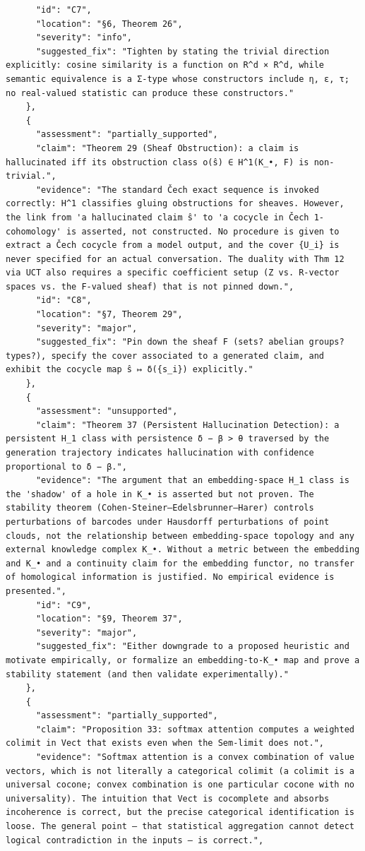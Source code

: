 \documentclass[11pt]{article}
\begin{document}
\begin{verbatim}
      "id": "C7",
      "location": "§6, Theorem 26",
      "severity": "info",
      "suggested_fix": "Tighten by stating the trivial direction explicitly: cosine similarity is a function on R^d × R^d, while semantic equivalence is a Σ-type whose constructors include η, ε, τ; no real-valued statistic can produce these constructors."
    },
    {
      "assessment": "partially_supported",
      "claim": "Theorem 29 (Sheaf Obstruction): a claim is hallucinated iff its obstruction class o(ŝ) ∈ H^1(K_•, F) is non-trivial.",
      "evidence": "The standard Čech exact sequence is invoked correctly: H^1 classifies gluing obstructions for sheaves. However, the link from 'a hallucinated claim ŝ' to 'a cocycle in Čech 1-cohomology' is asserted, not constructed. No procedure is given to extract a Čech cocycle from a model output, and the cover {U_i} is never specified for an actual conversation. The duality with Thm 12 via UCT also requires a specific coefficient setup (Z vs. R-vector spaces vs. the F-valued sheaf) that is not pinned down.",
      "id": "C8",
      "location": "§7, Theorem 29",
      "severity": "major",
      "suggested_fix": "Pin down the sheaf F (sets? abelian groups? types?), specify the cover associated to a generated claim, and exhibit the cocycle map ŝ ↦ δ({s_i}) explicitly."
    },
    {
      "assessment": "unsupported",
      "claim": "Theorem 37 (Persistent Hallucination Detection): a persistent H_1 class with persistence δ − β > θ traversed by the generation trajectory indicates hallucination with confidence proportional to δ − β.",
      "evidence": "The argument that an embedding-space H_1 class is the 'shadow' of a hole in K_• is asserted but not proven. The stability theorem (Cohen-Steiner–Edelsbrunner–Harer) controls perturbations of barcodes under Hausdorff perturbations of point clouds, not the relationship between embedding-space topology and any external knowledge complex K_•. Without a metric between the embedding and K_• and a continuity claim for the embedding functor, no transfer of homological information is justified. No empirical evidence is presented.",
      "id": "C9",
      "location": "§9, Theorem 37",
      "severity": "major",
      "suggested_fix": "Either downgrade to a proposed heuristic and motivate empirically, or formalize an embedding-to-K_• map and prove a stability statement (and then validate experimentally)."
    },
    {
      "assessment": "partially_supported",
      "claim": "Proposition 33: softmax attention computes a weighted colimit in Vect that exists even when the Sem-limit does not.",
      "evidence": "Softmax attention is a convex combination of value vectors, which is not literally a categorical colimit (a colimit is a universal cocone; convex combination is one particular cocone with no universality). The intuition that Vect is cocomplete and absorbs incoherence is correct, but the precise categorical identification is loose. The general point — that statistical aggregation cannot detect logical contradiction in the inputs — is correct.",

\end{verbatim}
\end{document}
